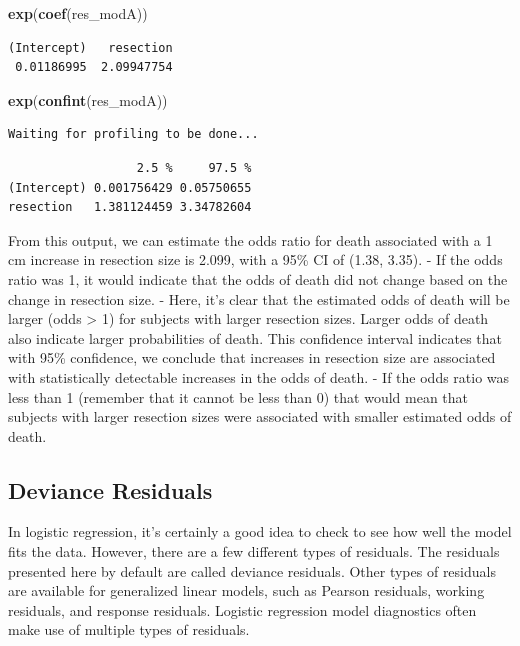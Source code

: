 \documentclass[]{book}
\newenvironment{Shaded}{\begin{snugshade}}{\end{snugshade}}
\newcommand{\KeywordTok}[1]{\textcolor[rgb]{0.13,0.29,0.53}{\textbf{#1}}}
\newcommand{\NormalTok}[1]{#1}
\theoremstyle{definition}
\theoremstyle{definition}
\theoremstyle{definition}
\theoremstyle{remark}
\begin{document}
\begin{Shaded}
\begin{Highlighting}[]
\KeywordTok{exp}\NormalTok{(}\KeywordTok{coef}\NormalTok{(res_modA))}
\end{Highlighting}
\end{Shaded}

\begin{verbatim}
(Intercept)   resection 
 0.01186995  2.09947754 
\end{verbatim}

\begin{Shaded}
\begin{Highlighting}[]
\KeywordTok{exp}\NormalTok{(}\KeywordTok{confint}\NormalTok{(res_modA))}
\end{Highlighting}
\end{Shaded}

\begin{verbatim}
Waiting for profiling to be done...
\end{verbatim}

\begin{verbatim}
                  2.5 %     97.5 %
(Intercept) 0.001756429 0.05750655
resection   1.381124459 3.34782604
\end{verbatim}

From this output, we can estimate the odds ratio for death associated
with a 1 cm increase in resection size is 2.099, with a 95\% CI of
(1.38, 3.35). - If the odds ratio was 1, it would indicate that the odds
of death did not change based on the change in resection size. - Here,
it's clear that the estimated odds of death will be larger (odds
\textgreater{} 1) for subjects with larger resection sizes. Larger odds
of death also indicate larger probabilities of death. This confidence
interval indicates that with 95\% confidence, we conclude that increases
in resection size are associated with statistically detectable increases
in the odds of death. - If the odds ratio was less than 1 (remember that
it cannot be less than 0) that would mean that subjects with larger
resection sizes were associated with smaller estimated odds of death.

\subsection{Deviance Residuals}\label{deviance-residuals}

In logistic regression, it's certainly a good idea to check to see how
well the model fits the data. However, there are a few different types
of residuals. The residuals presented here by default are called
deviance residuals. Other types of residuals are available for
generalized linear models, such as Pearson residuals, working residuals,
and response residuals. Logistic regression model diagnostics often make
use of multiple types of residuals.
\end{document}
